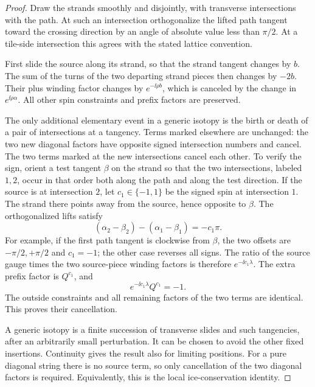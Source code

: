 \begin{proof}
Draw the strands smoothly and disjointly, with transverse intersections
with the path.  At such an intersection orthogonalize the lifted path
tangent toward the crossing direction by an angle of absolute value less
than $\pi/2$.  At a tile-side intersection this agrees with the stated
lattice convention.

First slide the source along its strand, so that the strand tangent
changes by $b$.  The sum of the turns of the two departing strand pieces
then changes by $-2b$.  Their plus winding factor changes by
$e^{-\ii\rho b}$, which is canceled by the change in
$e^{\ii\rho\alpha}$.  All other spin constraints and prefix factors are
preserved.

The only additional elementary event in a generic isotopy is the birth
or death of a pair of intersections at a tangency.  Terms marked
elsewhere are unchanged: the two new diagonal factors have opposite
signed intersection numbers and cancel.  The two terms marked at the
new intersections cancel each other.  To verify the sign, orient a test
tangent $\beta$ on the strand so that the two intersections, labeled
$1,2$, occur in that order both along the path and along the test
direction.  If the source is at intersection $2$, let $c_1\in\{-1,1\}$
be the signed spin at intersection $1$.  The strand there points away
from the source, hence opposite to $\beta$.  The orthogonalized lifts
satisfy
\begin{equation}
 (\alpha_2-\beta_2)-(\alpha_1-\beta_1)=-c_1\pi.
 \label{calc:tangency-lift}
\end{equation}
For example, if the first path tangent is clockwise from $\beta$, the
two offsets are $-\pi/2,+\pi/2$ and $c_1=-1$; the other case reverses
all signs.  The ratio of the source gauge times the two source-piece
winding factors is therefore $e^{-\ii c_1\lambda}$.  The extra prefix
factor is $Q^{c_1}$, and
\[
 e^{-\ii c_1\lambda}Q^{c_1}=-1.
\]
The outside constraints and all remaining factors of the two terms are
identical.  This proves their cancellation.

A generic isotopy is a finite succession of transverse slides and such
tangencies, after an arbitrarily small perturbation.  It can be chosen
to avoid the other fixed insertions.  Continuity gives the result also
for limiting positions.  For a pure diagonal string there is no source
term, so only cancellation of the two diagonal factors is required.
Equivalently, this is the local ice-conservation identity.
\end{proof}

